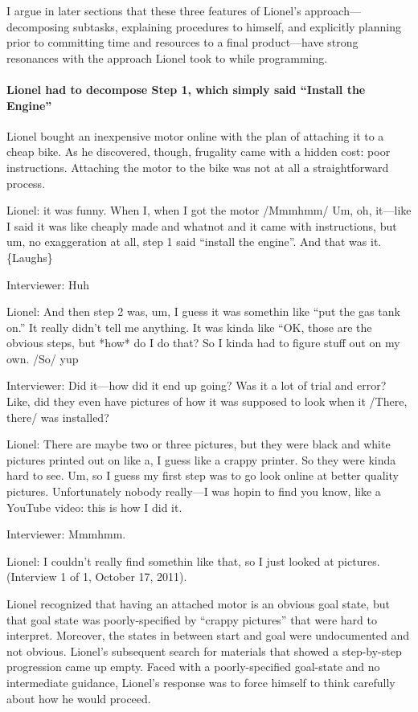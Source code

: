 I argue in later sections that these three features of Lionel's
approach---decomposing subtasks, explaining procedures to himself, and
explicitly planning prior to committing time and resources to a final
product---have strong resonances with the approach Lionel took to while
programming.

\paragraph{Lionel had to decompose Step 1, which simply said ``Install
the
Engine''}\label{lionel-had-to-decompose-step-1-which-simply-said-install-the-engine}

Lionel bought an inexpensive motor online with the plan of attaching it
to a cheap bike. As he discovered, though, frugality came with a hidden
cost: poor instructions. Attaching the motor to the bike was not at all
a straightforward process.

Lionel: it was funny. When I, when I got the motor /Mmmhmm/ Um, oh,
it---like I said it was like cheaply made and whatnot and it came with
instructions, but um, no exaggeration at all, step 1 said ``install the
engine''. And that was it. \{Laughs\}

Interviewer: Huh

Lionel: And then step 2 was, um, I guess it was somethin like ``put the
gas tank on.'' It really didn't tell me anything. It was kinda like
``OK, those are the obvious steps, but *how* do I do that? So I kinda
had to figure stuff out on my own. /So/ yup

Interviewer: Did it---how did it end up going? Was it a lot of trial and
error? Like, did they even have pictures of how it was supposed to look
when it /There, there/ was installed?

Lionel: There are maybe two or three pictures, but they were black and
white pictures printed out on like a, I guess like a crappy printer. So
they were kinda hard to see. Um, so I guess my first step was to go look
online at better quality pictures. Unfortunately nobody really---I was
hopin to find you know, like a YouTube video: this is how I did it.

Interviewer: Mmmhmm.

Lionel: I couldn't really find somethin like that, so I just looked at
pictures. (Interview 1 of 1, October 17, 2011).

Lionel recognized that having an attached motor is an obvious goal
state, but that goal state was poorly-specified by ``crappy pictures''
that were hard to interpret. Moreover, the states in between start and
goal were undocumented and not obvious. Lionel's subsequent search for
materials that showed a step-by-step progression came up empty. Faced
with a poorly-specified goal-state and no intermediate guidance,
Lionel's response was to force himself to think carefully about how he
would proceed.

